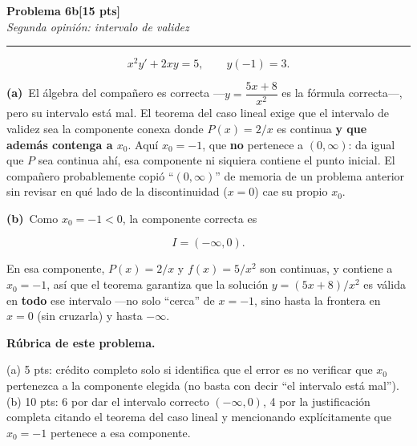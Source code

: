 \documentclass[11pt,letterpaper]{article}
\newcommand{\problema}[3]{%
  \bigskip\noindent
  {\large\textbf{Problema #1}}\hfill\textbf{[#2 pts]}\\[3pt]
  {\small\itshape #3}\par
  \vspace{2pt}\hrule\vspace{8pt}
}
\newcommand{\subparte}[2]{%
  \medskip\noindent\textbf{(#1}\ #2\par\smallskip
}
\newenvironment{resultado}
  {\begin{mdframed}[linecolor=black,linewidth=0.6pt,
    innerleftmargin=6pt,innerrightmargin=6pt,innertopmargin=4pt,innerbottommargin=4pt]
   \bfseries}
  {\end{mdframed}}
\newenvironment{rubrica}{%
  \begin{mdframed}[linecolor=black,linewidth=0.6pt,
    innerleftmargin=8pt,innerrightmargin=8pt,innertopmargin=5pt,innerbottommargin=5pt]
  \small\textbf{Rúbrica de este problema.}\par\smallskip
}{\end{mdframed}}
\begin{document}
\problema{6b}{15}{Segunda opinión: intervalo de validez}

\[
x^2y'+2xy=5, \qquad y(-1)=3.
\]

\subparte{a)}{El álgebra del compañero es correcta —$y=\dfrac{5x+8}{x^2}$ es la fórmula correcta—, pero su intervalo está mal. El teorema del caso lineal exige que el intervalo de validez sea la componente conexa donde $P(x)=2/x$ es continua \textbf{y que además contenga a $x_0$}. Aquí $x_0=-1$, que \textbf{no} pertenece a $(0,\infty)$: da igual que $P$ sea continua ahí, esa componente ni siquiera contiene el punto inicial. El compañero probablemente copió ``$(0,\infty)$'' de memoria de un problema anterior sin revisar en qué lado de la discontinuidad ($x=0$) cae su propio $x_0$.}

\subparte{b)}{Como $x_0=-1<0$, la componente correcta es
\begin{resultado}
\[
I = (-\infty, 0).
\]
\end{resultado}
En esa componente, $P(x)=2/x$ y $f(x)=5/x^2$ son continuas, y contiene a $x_0=-1$, así que el teorema garantiza que la solución $y=(5x+8)/x^2$ es válida en \textbf{todo} ese intervalo —no solo ``cerca'' de $x=-1$, sino hasta la frontera en $x=0$ (sin cruzarla) y hasta $-\infty$.}

\begin{rubrica}
(a) 5 pts: crédito completo solo si identifica que el error es no verificar que $x_0$ pertenezca a la componente elegida (no basta con decir ``el intervalo está mal''). (b) 10 pts: 6 por dar el intervalo correcto $(-\infty,0)$, 4 por la justificación completa citando el teorema del caso lineal y mencionando explícitamente que $x_0=-1$ pertenece a esa componente.
\end{rubrica}
\end{document}
